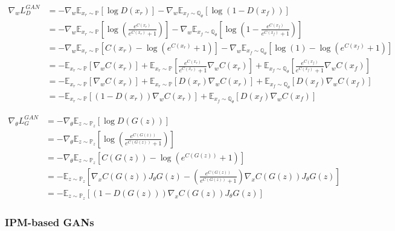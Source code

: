 \documentclass{article}
\begin{document}
\begin{align*}
\nabla_{w}L_D^{GAN} &= -\nabla_{w} \mathbb{E}_{x_r \sim \mathbb{P}}\left[ \log D(x_r) \right] - \nabla_{w} \mathbb{E}_{x_f \sim \mathbb{Q_\theta}}\left[ \log (1-D(x_f)) \right] \\
&= - \nabla_{w} \mathbb{E}_{x_r \sim \mathbb{P}}\left[ \log \left( \frac{e^{C(x_r)}}{e^{C(x_r)}+1} \right) \right] - \nabla_{w} \mathbb{E}_{x_f \sim \mathbb{Q_\theta}}\left[ \log \left(1 - \frac{e^{C(x_f)}}{e^{C(x_f)}+1} \right) \right] \\
&= -\nabla_{w} \mathbb{E}_{x_r \sim \mathbb{P}}\left[ C(x_r) - \log \left( e^{C(x_r)}+1 \right) \right] - \nabla_{w} \mathbb{E}_{x_f \sim \mathbb{Q_\theta}}\left[ \log(1) - \log \left( e^{C(x_f)}+1 \right) \right] \\
&= -\mathbb{E}_{x_r \sim \mathbb{P}}\left[ \nabla_{w} C(x_r)\right] + \mathbb{E}_{x_r \sim \mathbb{P}}\left[ \frac{e^{C(x_r)}}{e^{C(x_r)}+1} \nabla_{w} C(x_r) \right] +  \mathbb{E}_{x_f \sim \mathbb{Q_\theta}} \left[ \frac{e^{C(x_f)}}{e^{C(x_f)}+1} \nabla_{w} C(x_f) \right] \\
&= -\mathbb{E}_{x_r \sim \mathbb{P}}\left[ \nabla_{w} C(x_r)\right] + \mathbb{E}_{x_r \sim \mathbb{P}}\left[ D(x_r) \nabla_{w} C(x_r) \right] +  \mathbb{E}_{x_f \sim \mathbb{Q_\theta}} \left[ D(x_f) \nabla_{w} C(x_f) \right] \\
&= -\mathbb{E}_{x_r \sim \mathbb{P}}\left[ (1-D(x_r)) \nabla_{w} C(x_r) \right] +  \mathbb{E}_{x_f \sim \mathbb{Q_\theta}} \left[ D(x_f) \nabla_{w} C(x_f) \right]
\end{align*}

\begin{align*}
\nabla_{\theta}L_G^{GAN} &= -\nabla_{\theta} \mathbb{E}_{z \sim \mathbb{P}_z}\left[ \log D(G(z)) \right] \\
&= -\nabla_{\theta} \mathbb{E}_{z \sim \mathbb{P}_z} \left[ \log \left(\frac{e^{C(G(z))}}{e^{C(G(z))}+1} \right) \right] \\
&= -\nabla_{\theta} \mathbb{E}_{z \sim \mathbb{P}_z} \left[ C(G(z)) - \log \left( e^{C(G(z))}+1 \right) \right] \\
&= -\mathbb{E}_{z \sim \mathbb{P}_z} \left[ \nabla_{x} C(G(z)) J_{\theta} G(z) - \left( \frac{e^{C(G(z))}}{e^{C(G(z))}+1} \right) \nabla_{x} C(G(z)) J_{\theta} G(z) \right] \\
&= -\mathbb{E}_{z \sim \mathbb{P}_z} \left[ (1-D(G(z))) \nabla_{x} C(G(z)) J_{\theta} G(z) \right]
\end{align*}


\subsubsection{IPM-based GANs}
\end{document}
